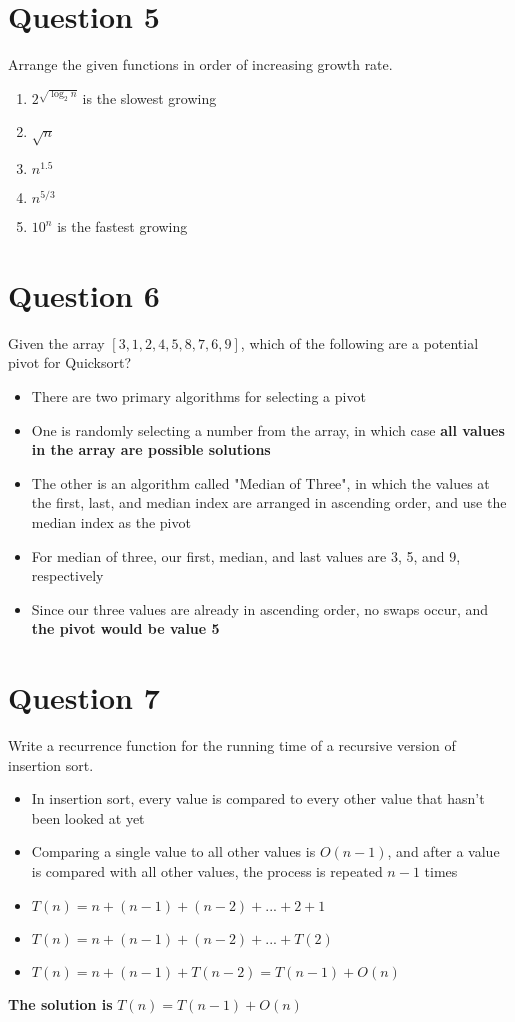 \documentclass{article}
\begin{document}
    \section{Question 5}
    Arrange the given functions in order of increasing growth rate.
        \begin{enumerate}
            \item{$2^{\sqrt{\log_2 n}}$ is the slowest growing}
            \item{$\sqrt n$}
            \item{$n^{1.5}$}
            \item{$n^{5/3}$}
            \item{$10^n$ is the fastest growing}
        \end{enumerate}

    \section{Question 6}
    Given the array $[3, 1, 2, 4, 5, 8, 7, 6, 9]$, which of the following are a potential pivot for Quicksort?
        \begin{itemize}
            \item{There are two primary algorithms for selecting a pivot}
            \item{One is randomly selecting a number from the array, in which case \textbf{all values in the array are possible solutions}}
            \item{The other is an algorithm called "Median of Three", in which the values at the first, last, and median index are arranged in ascending order, and use the median index as the pivot}
            \item{For median of three, our first, median, and last values are 3, 5, and 9, respectively}
            \item{Since our three values are already in ascending order, no swaps occur, and \textbf{the pivot would be value 5}}
        \end{itemize}

    \section{Question 7}
    Write a recurrence function for the running time of a recursive version of insertion sort.
    	\begin{itemize}
    		\item{In insertion sort, every value is compared to every other value that hasn't been looked at yet}
    		\item{Comparing a single value to all other values is $O(n - 1)$, and after a value is compared with all other values, the process is repeated $n-1$ times}
    		\item{$T(n) = n + (n - 1) + (n - 2) + ... + 2 + 1$}
    		\item{$T(n) = n + (n - 1) + (n-2) + ... + T(2)$}
    		\item{$T(n) = n + (n - 1) + T(n-2) = T(n-1) + O(n)$}
		\end{itemize}
    \textbf{The solution is} $T(n) = T(n-1) + O(n)$
\end{document}
